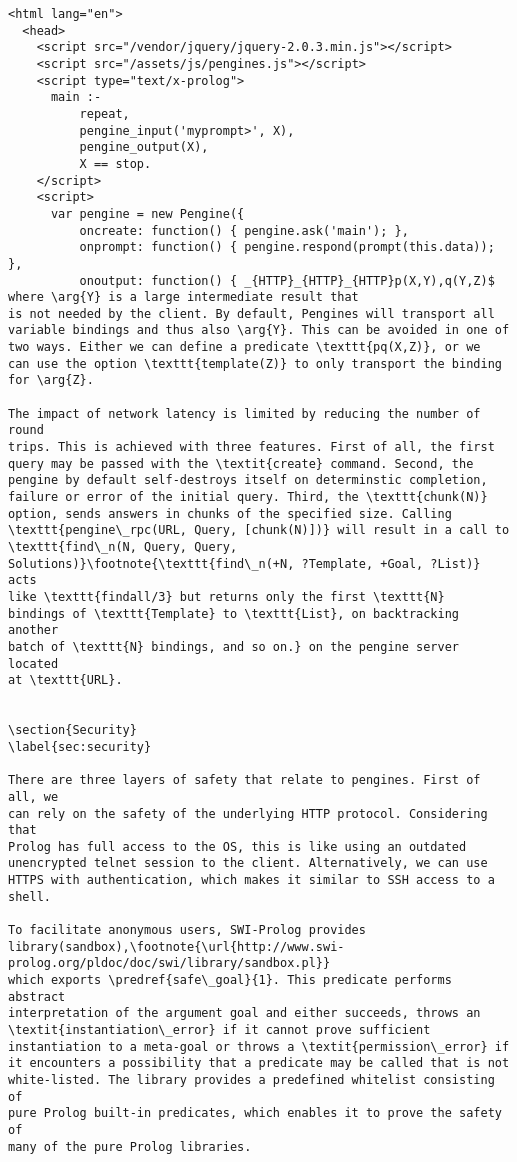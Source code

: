 \documentclass{new_tlp}
\newcommand{\reffont}{\tt}
\newcommand{\predref}[2]{\mbox{\reffont #1/#2}}
\renewcommand{\arg}[1]{\textit{#1}}
\begin{document}
\begin{verbatim}
<html lang="en">
  <head>
    <script src="/vendor/jquery/jquery-2.0.3.min.js"></script>
    <script src="/assets/js/pengines.js"></script>
    <script type="text/x-prolog">
      main :-
          repeat,
          pengine_input('myprompt>', X),
          pengine_output(X),
          X == stop.
    </script>
    <script>
      var pengine = new Pengine({
          oncreate: function() { pengine.ask('main'); },
          onprompt: function() { pengine.respond(prompt(this.data)); },
          onoutput: function() { _{HTTP}_{HTTP}_{HTTP}p(X,Y),q(Y,Z)$ where \arg{Y} is a large intermediate result that
is not needed by the client. By default, Pengines will transport all
variable bindings and thus also \arg{Y}. This can be avoided in one of
two ways. Either we can define a predicate \texttt{pq(X,Z)}, or we
can use the option \texttt{template(Z)} to only transport the binding
for \arg{Z}.

The impact of network latency is limited by reducing the number of round
trips. This is achieved with three features. First of all, the first
query may be passed with the \textit{create} command. Second, the
pengine by default self-destroys itself on determinstic completion,
failure or error of the initial query. Third, the \texttt{chunk(N)}
option, sends answers in chunks of the specified size. Calling
\texttt{pengine\_rpc(URL, Query, [chunk(N)])} will result in a call to
\texttt{find\_n(N, Query, Query,
Solutions)}\footnote{\texttt{find\_n(+N, ?Template, +Goal, ?List)} acts
like \texttt{findall/3} but returns only the first \texttt{N}
bindings of \texttt{Template} to \texttt{List}, on backtracking another
batch of \texttt{N} bindings, and so on.} on the pengine server located
at \texttt{URL}.


\section{Security}
\label{sec:security}

There are three layers of safety that relate to pengines. First of all, we
can rely on the safety of the underlying HTTP protocol. Considering that
Prolog has full access to the OS, this is like using an outdated
unencrypted telnet session to the client. Alternatively, we can use
HTTPS with authentication, which makes it similar to SSH access to a
shell.

To facilitate anonymous users, SWI-Prolog provides
library(sandbox),\footnote{\url{http://www.swi-prolog.org/pldoc/doc/swi/library/sandbox.pl}}
which exports \predref{safe\_goal}{1}. This predicate performs abstract
interpretation of the argument goal and either succeeds, throws an
\textit{instantiation\_error} if it cannot prove sufficient
instantiation to a meta-goal or throws a \textit{permission\_error} if
it encounters a possibility that a predicate may be called that is not
white-listed. The library provides a predefined whitelist consisting of
pure Prolog built-in predicates, which enables it to prove the safety of
many of the pure Prolog libraries.


\end{verbatim}
\end{document}
